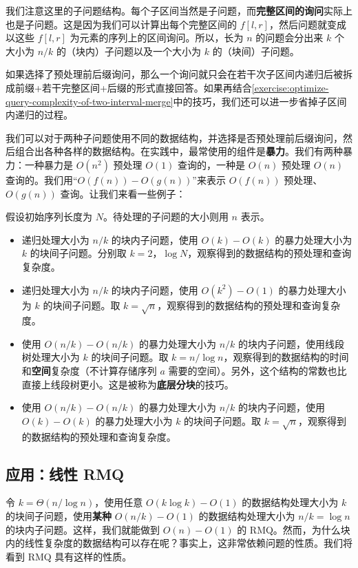 我们注意这里的子问题结构。每个子区间当然是子问题，而\textbf{完整区间的询问}实际上也是子问题。这是因为我们可以计算出每个完整区间的 $f[l,r]$，然后问题就变成以这些 $f[l,r]$ 为元素的序列上的区间询问。所以，长为 $n$ 的问题会分出来 $k$ 个大小为 $n/k$ 的（块内）子问题以及一个大小为 $k$ 的（块间）子问题。


\begin{remark}
    如果选择了预处理前后缀询问，那么一个询问就只会在若干次子区间内递归后被拆成前缀+若干完整区间+后缀的形式直接回答。如果再结合\cref{exercise:optimize-query-complexity-of-two-interval-merge}中的技巧，我们还可以进一步省掉子区间内递归的过程。
\end{remark}

我们可以对于两种子问题使用不同的数据结构，并选择是否预处理前后缀询问，然后组合出各种各样的数据结构。在实践中，最常使用的组件是\textbf{暴力}。我们有两种暴力：一种暴力是 $O(n^2)$ 预处理 $O(1)$ 查询的，一种是 $O(n)$ 预处理 $O(n)$ 查询的。我们用“$O(f(n))-O(g(n))$”来表示 $O(f(n))$ 预处理、$O(g(n))$ 查询。让我们来看一些例子：

\begin{example}
    假设初始序列长度为 $N$。待处理的子问题的大小则用 $n$ 表示。
\begin{itemize}
    \item 递归处理大小为 $n/k$ 的块内子问题，使用 $O(k)-O(k)$ 的暴力处理大小为 $k$ 的块间子问题。分别取 $k=2$，$\log N$，观察得到的数据结构的预处理和查询复杂度。
    \item 递归处理大小为 $n/k$ 的块内子问题，使用 $O(k^2)-O(1)$ 的暴力处理大小为 $k$ 的块间子问题。取 $k=\sqrt{n}$，观察得到的数据结构的预处理和查询复杂度。
    \item 使用 $O(n/k)-O(n/k)$ 的暴力处理大小为 $n/k$ 的块内子问题，使用线段树处理大小为 $k$ 的块间子问题。取 $k=n/\log n$，观察得到的数据结构的时间和\textbf{空间}复杂度（不计算存储序列 $a$ 需要的空间）。另外，这个结构的常数也比直接上线段树更小。这是被称为\textbf{底层分块}的技巧。
    \item 使用 $O(n/k)-O(n/k)$ 的暴力处理大小为 $n/k$ 的块内子问题，使用 $O(k)-O(k)$ 的暴力处理大小为 $k$ 的块间子问题。取 $k=\sqrt{n}$，观察得到的数据结构的预处理和查询复杂度。
\end{itemize}
\end{example}


\subsection{应用：线性 RMQ}

令 $k=\Theta(n/\log n)$，使用任意 $O(k\log k)-O(1)$ 的数据结构处理大小为 $k$ 的块间子问题，使用\textbf{某种} $O(n/k)-O(1)$ 的数据结构处理大小为 $n/k=\log n$ 的块内子问题。这样，我们就能做到 $O(n)-O(1)$ 的 RMQ。然而，为什么块内的线性复杂度的数据结构可以存在呢？事实上，这非常依赖问题的性质。我们将看到 RMQ 具有这样的性质。

